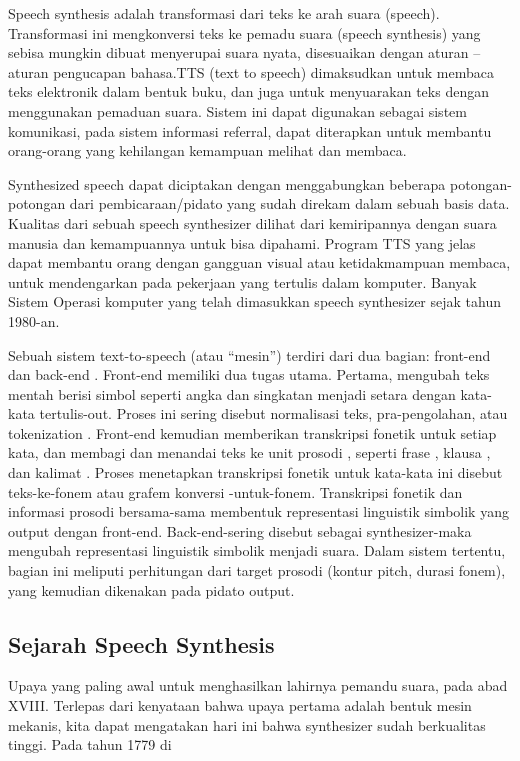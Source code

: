 Speech synthesis adalah transformasi dari teks ke arah suara (speech). Transformasi ini mengkonversi teks ke pemadu suara (speech synthesis) yang sebisa mungkin dibuat menyerupai suara nyata, disesuaikan dengan aturan – aturan pengucapan bahasa.TTS (text to speech) dimaksudkan untuk membaca teks elektronik dalam bentuk buku, dan juga untuk menyuarakan teks dengan menggunakan pemaduan suara. Sistem ini dapat digunakan sebagai sistem komunikasi, pada sistem informasi referral, dapat diterapkan untuk membantu orang-orang yang kehilangan kemampuan melihat dan membaca\cite{8639589}.

Synthesized speech dapat diciptakan dengan menggabungkan beberapa potongan-potongan dari pembicaraan/pidato yang sudah direkam dalam sebuah basis data. Kualitas dari sebuah speech synthesizer dilihat dari kemiripannya dengan suara manusia dan kemampuannya untuk bisa dipahami. Program TTS yang jelas dapat membantu orang dengan gangguan visual atau ketidakmampuan membaca, untuk mendengarkan pada pekerjaan yang tertulis dalam komputer. Banyak Sistem Operasi komputer yang telah dimasukkan speech synthesizer sejak tahun 1980-an.

Sebuah sistem text-to-speech (atau “mesin”) terdiri dari dua bagian: front-end dan back-end . Front-end memiliki dua tugas utama. Pertama, mengubah teks mentah berisi simbol seperti angka dan singkatan menjadi setara dengan kata-kata tertulis-out. Proses ini sering disebut normalisasi teks, pra-pengolahan, atau tokenization . Front-end kemudian memberikan transkripsi fonetik untuk setiap kata, dan membagi dan menandai teks ke unit prosodi , seperti frase , klausa , dan kalimat . Proses menetapkan transkripsi fonetik untuk kata-kata ini disebut teks-ke-fonem atau grafem konversi -untuk-fonem. Transkripsi fonetik dan informasi prosodi bersama-sama membentuk representasi linguistik simbolik yang output dengan front-end. Back-end-sering disebut sebagai synthesizer-maka mengubah representasi linguistik simbolik menjadi suara. Dalam sistem tertentu, bagian ini meliputi perhitungan dari target prosodi (kontur pitch, durasi fonem), yang kemudian dikenakan pada pidato output.

\subsection{Sejarah Speech Synthesis}
Upaya yang paling awal untuk menghasilkan lahirnya pemandu suara, pada abad XVIII. Terlepas dari kenyataan bahwa upaya pertama  adalah bentuk mesin mekanis, kita dapat mengatakan hari ini  bahwa synthesizer sudah berkualitas tinggi. Pada tahun 1779 di

